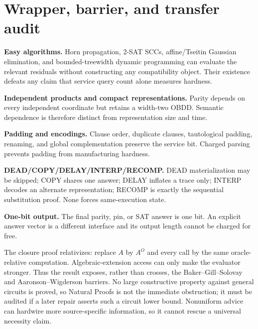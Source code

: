 \documentclass[11pt]{article}
\begin{document}
\section{Wrapper, barrier, and transfer audit}

\begin{description}[leftmargin=0cm,labelwidth=0cm]
\item[] \textbf{Easy algorithms.}
Horn propagation, 2-SAT SCCs, affine/Tseitin Gaussian elimination, and
bounded-treewidth dynamic programming can evaluate the relevant residuals
without constructing any compatibility object.  Their existence defeats any
claim that service query count alone measures hardness.
\item[] \textbf{Independent products and compact representations.}
Parity depends on every independent coordinate but retains a width-two OBDD.
Semantic dependence is therefore distinct from representation size and time.
\item[] \textbf{Padding and encodings.}
Clause order, duplicate clauses, tautological padding, renaming, and global
complementation preserve the service bit.  Charged parsing prevents padding
from manufacturing hardness.
\item[] \textbf{DEAD/COPY/DELAY/INTERP/RECOMP.}
DEAD materialization may be skipped; COPY shares one answer; DELAY inflates
a trace only; INTERP decodes an alternate representation; RECOMP is exactly
the sequential substitution proof.  None forces same-execution state.
\item[] \textbf{One-bit output.}
The final parity, pin, or SAT answer is one bit.  An explicit answer vector is
a different interface and its output length cannot be charged for free.
\end{description}

The closure proof relativizes: replace $A$ by $A^O$ and every call by the
same oracle-relative computation.  Algebraic-extension access can only make
the evaluator stronger.  Thus the result exposes, rather than crosses, the
Baker--Gill--Solovay and Aaronson--Wigderson barriers.  No large constructive
property against general circuits is proved, so Natural Proofs is not the
immediate obstruction; it must be audited if a later repair asserts such a
circuit lower bound.  Nonuniform advice can hardwire more source-specific
information, so it cannot rescue a universal necessity claim.
\end{document}
